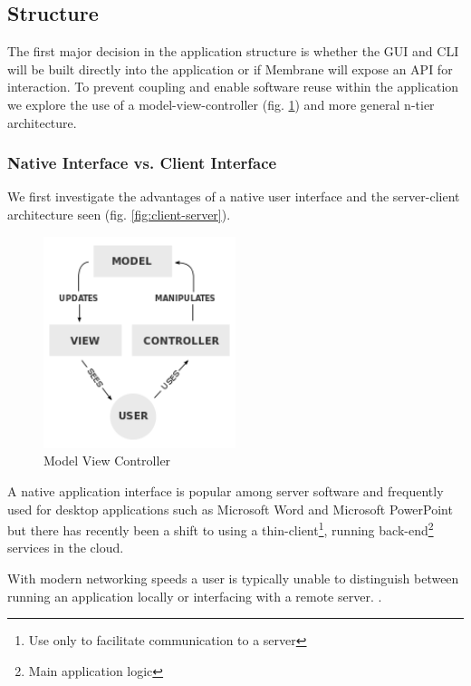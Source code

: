 \documentclass[11pt, a4paper, twoside]{report}
\begin{document}
\subsection{Structure}

The first major decision in the application structure is whether the GUI and CLI will be built directly into the application or if Membrane will expose an API for interaction. To prevent coupling and enable software reuse within the application \citep{gamma1995design} we explore the use of a model-view-controller (fig. \ref{fig:model-view-controller}) and more general n-tier architecture.

\subsubsection{Native Interface vs. Client Interface}

We first investigate the advantages of a native user interface and the server-client architecture seen (fig. \ref{fig:client-server}).

\begin{figure}[b!]
 \centering
 \includegraphics[width=0.5\textwidth]{model-view-controller}
 \caption{Model View Controller}
 \label{fig:model-view-controller}
\end{figure}

A native application interface is popular among server software and frequently used for desktop applications such as Microsoft Word and Microsoft PowerPoint but there has recently been a shift to using a thin-client\footnote{Use only to facilitate communication to a server}, running back-end\footnote{Main application logic} services in the cloud.

With modern networking speeds a user is typically unable to distinguish between running an application locally or interfacing with a remote server. \citep{schmidt1999interactive}.
\end{document}

